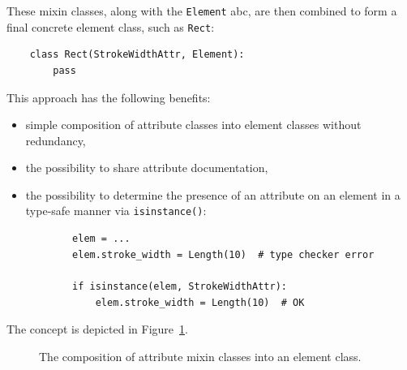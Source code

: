 These mixin classes, along with the \texttt{Element} \gls{abc}, are then combined to form a final concrete element class, such as \texttt{Rect}:
\begin{verbatim}
    class Rect(StrokeWidthAttr, Element):
        pass
\end{verbatim}

This approach has the following benefits:
\begin{itemize}
    \item simple composition of attribute classes into element classes without redundancy,
    \item the possibility to share attribute documentation,
    \item 
    \begin{samepage}
    the possibility to determine the presence of an attribute on an element in a type-safe manner via \texttt{isinstance()}:
    \begin{verbatim}
        elem = ...
        elem.stroke_width = Length(10)  # type checker error
        
        if isinstance(elem, StrokeWidthAttr):
            elem.stroke_width = Length(10)  # OK
    \end{verbatim}
    \end{samepage}
\end{itemize}

The concept is depicted in Figure~\ref{fig:element-composition}.

\begin{figure}[H]
    \centering
    \caption{The composition of attribute mixin classes into an element class.}
    \label{fig:element-composition}
\end{figure}

